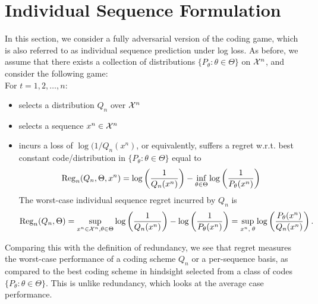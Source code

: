 \documentclass[12pt]{article}
\begin{document}
\section{Individual Sequence Formulation}

In this section, we consider a fully adversarial version of the coding game, which is also referred to as individual sequence prediction under log loss. As before, we assume that there exists a collection of distributions $\{P_\theta: \theta \in \Theta\}$ on ${\cal X}^n$, and consider the following game: \\
For $t=1, 2, \ldots, n$: 
\begin{itemize}
    \item \coder selects a distribution $Q_n$ over ${\cal X}^n$
    \item \nature selects a sequence $x^n \in {\cal X}^n$
    \item \coder incurs a loss of $\log(1/Q_n(x^n)$, or equivalently, suffers a regret w.r.t. best constant code/distribution in $\{P_\theta: \theta \in \Theta\}$ equal to 
    \begin{align}
        \mathrm{Reg}_n(Q_n, \Theta, x^n) = \log\left( \frac{1}{Q_n(x^n)} \right) - \inf_{\theta \in \Theta} \log \left( \frac{1}{P_\theta(x^n)} \right)
    \end{align}
    The worst-case individual sequence regret incurred by $Q_n$ is 
    \begin{align}
        \mathrm{Reg}_n(Q_n, \Theta) = \sup_{x^n \in {\cal X}^n, \theta \in \Theta} \log \left( \frac{1}{Q_n(x^n)} \right) - \log \left( \frac 1 {P_\theta(x^n)} \right)= \sup_{x^n,\; \theta} \log \left( \frac{P_\theta(x^n)}{Q_n(x^n)} \right). 
    \end{align}
\end{itemize}
Comparing this with the definition of redundancy, we see that regret measures the worst-case performance of a coding scheme $Q_n$ or a per-sequence basis, as compared to the best coding scheme in hindsight selected from a class of codes $\{P_\theta: \theta \in \Theta\}$. This is unlike redundancy, which looks at the average case performance. 
\end{document}
